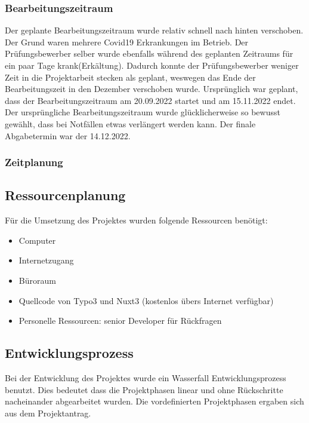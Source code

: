 \subsubsection{Bearbeitungszeitraum}
\label{sec:AbweichungenProjektantrag}
Der geplante Bearbeitungszeitraum wurde relativ schnell nach hinten verschoben. Der Grund waren mehrere Covid19 Erkrankungen im Betrieb. Der Prüfungsbewerber selber wurde ebenfalls während des geplanten Zeitraums für ein paar Tage krank(Erkältung). Dadurch konnte der Prüfungsbewerber weniger Zeit in die Projektarbeit stecken als geplant, weswegen das Ende der Bearbeitungszeit in den Dezember verschoben wurde. Ursprünglich war geplant, dass der Bearbeitungszeitraum am 20.09.2022 startet und am 15.11.2022 endet. Der ursprüngliche Bearbeitungszeitraum wurde glücklicherweise so bewusst gewählt, dass bei Notfällen etwas verlängert werden kann. Der finale Abgabetermin war der 14.12.2022.

\subsubsection{Zeitplanung}
\label{sec:AbweichungenProjektantrag}

\subsection{Ressourcenplanung}
\label{sec:Ressourcenplanung}

Für die Umsetzung des Projektes wurden folgende Ressourcen benötigt:
\begin{itemize}
	\item Computer
	\item Internetzugang
	\item Büroraum
	\item Quellcode von Typo3 und Nuxt3 (kostenlos übers Internet verfügbar)
	\item Personelle Ressourcen: senior Developer für Rückfragen
\end{itemize}

\subsection{Entwicklungsprozess}
\label{sec:Entwicklungsprozess}

Bei der Entwicklung des Projektes wurde ein Wasserfall Entwicklungsprozess benutzt. Dies bedeutet dass die Projektphasen linear und ohne Rückschritte nacheinander abgearbeitet wurden. Die vordefinierten Projektphasen ergaben sich aus dem Projektantrag.
